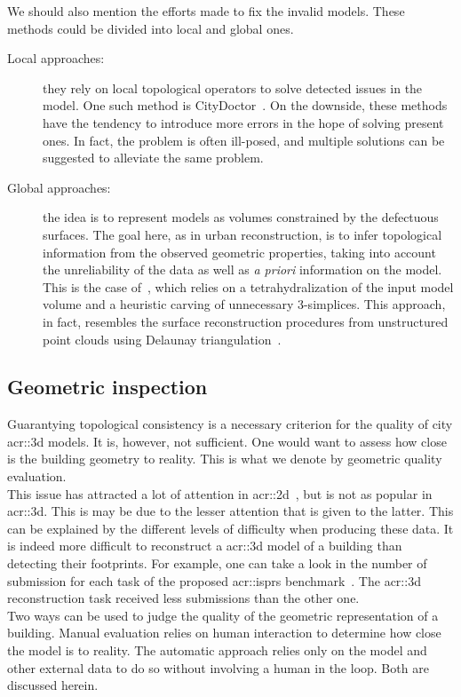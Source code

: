         We should also mention the efforts made to fix the invalid models. 
        These methods could be divided into local and global ones.
        \begin{description}
            \item[Local approaches:] they rely on local topological operators to solve detected issues in the model.
                    One such method is CityDoctor~\parencite{alam2014towards}.
                    On the downside, these methods have the tendency to introduce more errors in the hope of solving present ones.
                    In fact, the problem is often ill-posed, and multiple solutions can be suggested to alleviate the same problem.
            \item[Global approaches:] the idea is to represent models as volumes constrained by the defectuous surfaces.
                    The goal here, as in urban reconstruction, is to infer topological information from the observed geometric properties, taking into account the unreliability of the data as well as \textit{a priori} information on the model.
                    This is the case of~\parencite{zhao2013automatic}, which relies on a tetrahydralization of the input model volume and a heuristic carving of unnecessary 3-simplices.
                    This approach, in fact, resembles the surface reconstruction procedures from unstructured point clouds using Delaunay triangulation~\parencite{cazals2006delaunay, berger2014state}.
        \end{description}

    \subsection{Geometric inspection}
        \label{subsec::introduction::building_model_evaluation::geometric}
        Guarantying topological consistency is a necessary criterion for the quality of city \gls{acr::3d} models.
        It is, however, not sufficient.
        One would want to assess how close is the building geometry to reality.
        This is what we denote by geometric quality evaluation.\\
        This issue has attracted a lot of attention in \gls{acr::2d}~\parencite{mooney2010towards}, but is not as popular in \gls{acr::3d}.
        This is may be due to the lesser attention that is given to the latter.
        This can be explained by the different levels of difficulty when producing these data.
        It is indeed more difficult to reconstruct a \gls{acr::3d} model of a building than detecting their footprints.
        For example, one can take a look in the number of submission for each task of the proposed \gls{acr::isprs} benchmark~\parencite{rottensteiner2012isprs, rottensteiner2014results}.
        The \gls{acr::3d} reconstruction task received less submissions than the other one.\\
        Two ways can be used to judge the quality of the geometric representation of a building.
        Manual evaluation relies on human interaction to determine how close the model is to reality.
        The automatic approach relies only on the model and other external data to do so without involving a human in the loop.
        Both are discussed herein.

